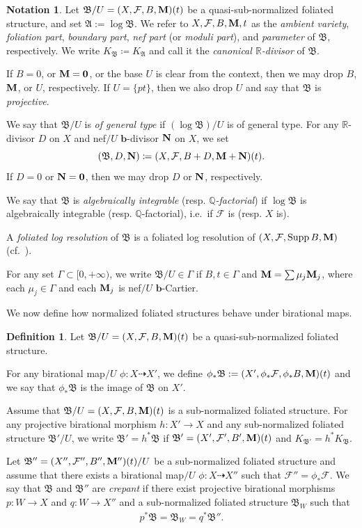 \documentclass[11pt,reqno]{amsart}
\numberwithin{equation}{section}
\newcommand{\bb}{\bm{b}}
\newcommand{\Mm}{{\bf{M}}}
\newcommand{\Nn}{{\bf{N}}}
\newcommand{\Supp}{\operatorname{Supp}}
\newcommand{\Aa}{{\mathfrak{A}}}
\newcommand{\Bb}{{\mathfrak{B}}}
\newcommand{\Ff}{\mathcal{F}}
\newcommand{\Ii}{\Gamma}
\theoremstyle{definition}
\newtheorem{defn}[thm]{Definition}
\newtheorem{nota}[thm]{Notation}
\begin{document}
\begin{nota}
Let $\Bb/U=(X,\Ff,B,\Mm)(t)$ be a quasi-sub-normalized foliated structure, and set $\Aa:=\log\Bb$.
We refer to $X,\Ff,B,\Mm,t$ as the \emph{ambient variety}, \emph{foliation part}, \emph{boundary part}, \emph{nef part} (or \emph{moduli part}), and \emph{parameter} of $\Bb$, respectively.
We write $K_{\Bb}\coloneqq K_{\Aa}$ and call it the \emph{canonical $\mathbb R$-divisor} of $\Bb$.

If $B=0$, or $\Mm=\bm{0}$, or the base $U$ is clear from the context, then we may drop $B$, $\Mm$, or $U$, respectively.
If $U=\{pt\}$, then we also drop $U$ and say that $\Bb$ is \emph{projective}.

We say that $\Bb/U$ is \emph{of general type} if $(\log\Bb)/U$ is of general type.
For any $\mathbb R$-divisor $D$ on $X$ and nef$/U$ $\bb$-divisor $\Nn$ on $X$, we set
\[
(\Bb,D,\Nn)\coloneqq (X,\Ff,B+D,\Mm+\Nn)(t).
\]
If $D=0$ or $\Nn=\bm{0}$, then we may drop $D$ or $\Nn$, respectively.

We say that $\Bb$ is \emph{algebraically integrable} (resp. \emph{$\mathbb Q$-factorial}) if $\log\Bb$ is algebraically integrable (resp. $\mathbb Q$-factorial), i.e.\ if $\Ff$ is (resp. $X$ is).

A \emph{foliated log resolution} of $\Bb$ is a foliated log resolution of $(X,\Ff,\Supp B,\Mm)$ (cf.~\cite[Definition~6.2.3]{CHLX23}).

For any set $\Ii\subset [0,+\infty)$, we write $\Bb/U\in\Ii$ if $B,t\in\Ii$ and $\Mm=\sum\mu_j\Mm_j$, where each $\mu_j\in\Ii$ and each $\Mm_j$ is nef$/U$ $\bb$-Cartier.
\end{nota}

We now define how normalized foliated structures behave under birational maps.


\begin{defn}
Let $\Bb/U=(X,\Ff,B,\Mm)(t)$ be a quasi-sub-normalized foliated structure. 

For any birational map$/U$ $\phi\colon X\dashrightarrow X'$, we define $\phi_*\Bb:=(X',\phi_*\Ff,\phi_*B,\Mm)(t)$ and we say that $\phi_*\Bb$ is the image of $\Bb$ on $X'$. 

Assume that $\Bb/U=(X,\Ff,B,\Mm)(t)$ is a sub-normalized foliated structure. For any projective birational morphism $h\colon X'\rightarrow X$ and any sub-normalized foliated structure $\Bb'/U$, we write $\Bb'=h^*\Bb$ if $\Bb'=(X',\Ff',B',\Mm)(t)$ and $K_{\Bb'}=h^*K_{\Bb}$. 

Let $\Bb''=(X'',\Ff'',B'',\Mm'')(t)/U$ be a sub-normalized foliated structure and assume that there exists a birational map$/U$ $\phi\colon X\dashrightarrow X''$ such that $\Ff''=\phi_*\Ff$. 
We say that $\Bb$ and $\Bb''$ are \emph{crepant} if there exist projective birational morphisms $p\colon W\rightarrow X$ and $q\colon W\rightarrow X''$ and a sub-normalized foliated structure $\Bb_W$ such that 
\begin{align*}
p^*\Bb=\Bb_W=q^*\Bb''.    
\end{align*}
\end{defn}
\end{document}
